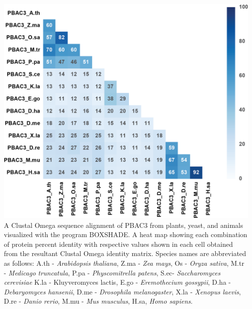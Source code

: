 \begin{FPfigure}
	\ContinuedFloat
	\centering
	\includegraphics[width=\columnwidth]{Proteasome/pbac3align2.png}
	{A Clustal Omega \citep{sievers14} sequence alignment of PBAC3 from plants, yeast, and animals visualized with the program BOXSHADE. A heat map showing each combination of protein percent identity with respective values shown in each cell obtained from the resultant Clustal Omega identity matrix. Species names are abbreviated as follows: A.th - \textit{Arabidopsis thaliana}, Z.ma - \textit{Zea mays}, Os - \textit{Oryza sativa}, M.tr - \textit{Medicago truncatula}, P.pa - \textit{Physcomitrella patens}, S.ec- \textit{Saccharomyces cerevisiae} K.la - {Kluyveromyces lactis}, E.go - \textit{Eremothecium gossypii}, D.ha - \textit{Debaryomyces hansenii}, D.me - \textit{Drosophila melanogaster}, X.la - \textit{Xenopus laevis}, D.re - \textit{Danio rerio}, M.mu - \textit{Mus musculus}, H.sa, \textit{Homo sapiens}.}
	\label{fig:pbac3align2}
\end{FPfigure}
\clearpage

